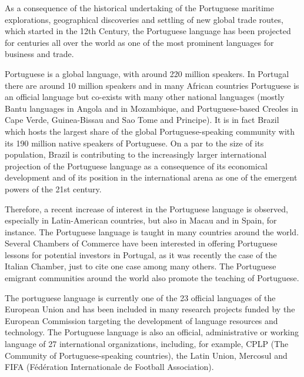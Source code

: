 \documentclass[]{../metanetpaper}
\begin{document}
\begin{multicols}{2}
 As a consequence of the historical undertaking of the Portuguese maritime explorations, geographical discoveries and settling of new global trade routes, which started in the 12th Century, the Portuguese language has been projected for centuries all over the world as one of the most prominent languages for business and trade.

Portuguese is a global language, with around 220 million speakers. In Portugal there are around 10 million speakers\cite{census} and in many African countries Portuguese is an official language but co-exists with many other national languages (mostly Bantu languages in Angola and in Mozambique, and Portuguese-based Creoles in Cape Verde, Guinea-Bissau and Sao Tome and Principe).  It is in fact Brazil which hosts the largest share of the global Portuguese-speaking community with its 190 million native speakers of Portuguese. On a par to the size of its population, Brazil is contributing to the increasingly larger international projection of the Portuguese language as a consequence of its economical development and of its position in the international arena as one of the emergent powers of the 21st century. 


Therefore, a recent increase of interest in the Portuguese language is observed, especially in Latin-American countries, but also in Macau and in Spain, for instance. The Portuguese language is taught in many countries around the world\cite{camoes2}. Several Chambers of Commerce have been interested in offering Portuguese lessons for potential investors in Portugal, as it was recently the case of the Italian Chamber, just to cite one case among many others. The Portuguese emigrant communities around the world also promote the teaching of Portuguese.


The portuguese language is currently one of the 23 official languages of the European Union and has been included in many research projects funded by the European Commission targeting the development of language resources and technology. The Portuguese language is also an official, administrative or working language of 27 international organizations, including, for example, CPLP (The Community of Portuguese-speaking countries), the Latin Union, Mercosul and FIFA (Fédération Internationale de Football Association). 


\end{multicols}
\end{document}
